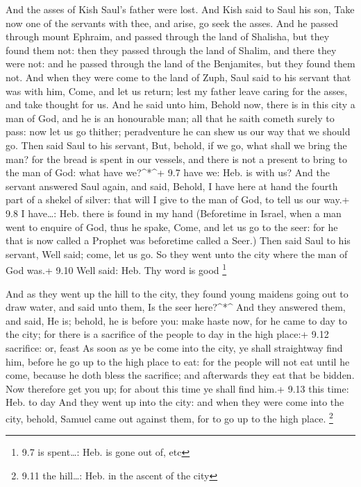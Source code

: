  And the asses of Kish Saul's father were lost. And Kish
said to Saul his son, Take now one of the servants with thee, and arise,
go seek the asses.  And he passed through mount Ephraim, and
passed through the land of Shalisha, but they found them not: then they
passed through the land of Shalim, and there they were not: and he
passed through the land of the Benjamites, but they found them not.
 And when they were come to the land of Zuph, Saul said to
his servant that was with him, Come, and let us return; lest my father
leave caring for the asses, and take thought for us.  And he
said unto him, Behold now, there is in this city a man of God, and he is
an honourable man; all that he saith cometh surely to pass: now let us
go thither; peradventure he can shew us our way that we should go.
 Then said Saul to his servant, But, behold, if we go, what
shall we bring the man? for the bread is spent in our vessels, and there
is not a present to bring to the man of God: what have we?\^{}*\^{}+ 9.7
have we: Heb. is with us?  And the servant answered Saul
again, and said, Behold, I have here at hand the fourth part of a shekel
of silver: that will I give to the man of God, to tell us our way.+ 9.8
I have\ldots: Heb. there is found in my hand  (Beforetime in
Israel, when a man went to enquire of God, thus he spake, Come, and let
us go to the seer: for he that is now called a Prophet was beforetime
called a Seer.)  Then said Saul to his servant, Well said;
come, let us go. So they went unto the city where the man of God was.+
9.10 Well said: Heb. Thy word is good \footnote{9.7 is spent\ldots: Heb.
  is gone out of, etc}

 And as they went up the hill to the city, they found young
maidens going out to draw water, and said unto them, Is the seer
here?\^{}*\^{}  And they answered them, and said, He is;
behold, he is before you: make haste now, for he came to day to the
city; for there is a sacrifice of the people to day in the high place:+
9.12 sacrifice: or, feast  As soon as ye be come into the
city, ye shall straightway find him, before he go up to the high place
to eat: for the people will not eat until he come, because he doth bless
the sacrifice; and afterwards they eat that be bidden. Now therefore get
you up; for about this time ye shall find him.+ 9.13 this time: Heb. to
day  And they went up into the city: and when they were
come into the city, behold, Samuel came out against them, for to go up
to the high place. \footnote{9.11 the hill\ldots: Heb. in the ascent of
  the city}

